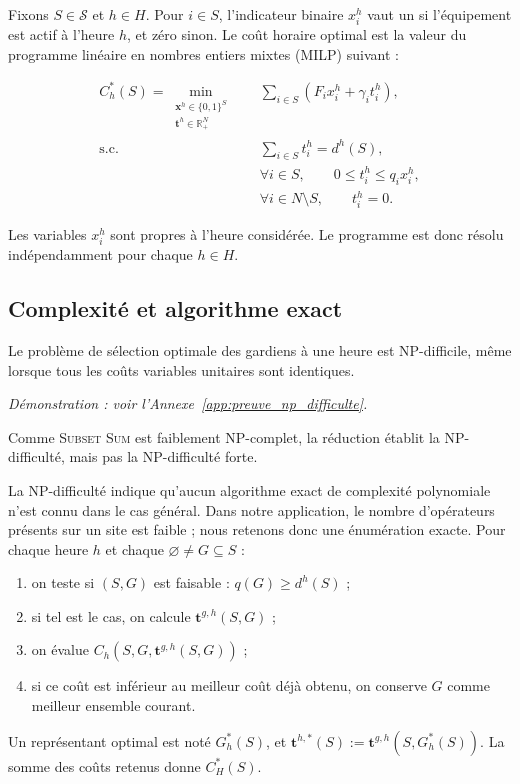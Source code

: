 Fixons \(S\in\mathcal S\) et \(h\in H\). Pour \(i\in S\), l'indicateur
binaire \(x_i^h\) vaut un si l'équipement est actif à l'heure \(h\), et zéro
sinon. Le coût horaire optimal est la valeur du programme linéaire en nombres
entiers mixtes (MILP) suivant :

\begin{equation}
\label{eq:milp_horaire}
\begin{aligned}
C_h^*(S)
=
\min_{\substack{\mathbf x^h\in\{0,1\}^S\\
                \mathbf t^h\in\mathbb R_+^N}}\quad
    & \sum_{i\in S}\left(F_i x_i^h+\gamma_i t_i^h\right),\\
\text{s.c.}\quad
    & \sum_{i\in S}t_i^h=d^h(S),\\
    & \forall i\in S,\qquad
      0\leqslant t_i^h\leqslant q_i x_i^h,\\
    & \forall i\in N\setminus S,\qquad
      t_i^h=0.
\end{aligned}
\end{equation}

Les variables \(x_i^h\) sont propres à l'heure considérée. Le programme est
donc résolu indépendamment pour chaque \(h\in H\).

\subsection{Complexité et algorithme exact}

\begin{proposition}[NP-difficulté]
\label{prop:np_difficulte_gardiens}
Le problème de sélection optimale des gardiens à une heure est NP-difficile,
même lorsque tous les coûts variables unitaires sont identiques.
\end{proposition}

\emph{Démonstration : voir l'Annexe~\ref{app:preuve_np_difficulte}.}

\begin{remarque}
Comme \textsc{Subset Sum} est faiblement NP-complet, la réduction établit la
NP-difficulté, mais pas la NP-difficulté forte.
\end{remarque}

La NP-difficulté indique qu'aucun algorithme exact de complexité polynomiale
n'est connu dans le cas général. Dans notre application, le nombre
d'opérateurs présents sur un site est faible ; nous retenons donc une
énumération exacte. Pour chaque heure \(h\) et chaque
\(\varnothing \neq G\subseteq S\) :
\begin{enumerate}
    \item on teste si $(S, G)$ est faisable : \(q(G)\geqslant d^h(S)\) ;
    \item si tel est le cas, on calcule
    \(\mathbf t^{g,h}(S,G)\) ;
    \item on évalue \(C_h(S,G,\mathbf t^{g,h}(S,G))\) ;
    \item si ce coût est inférieur au meilleur coût déjà obtenu, on conserve
    \(G\) comme meilleur ensemble courant.
\end{enumerate}
Un représentant optimal est noté \(G_h^*(S)\), et
\(\mathbf t^{h,*}(S):=\mathbf t^{g,h}(S,G_h^*(S))\). La somme des coûts
retenus donne \(C_H^*(S)\).

